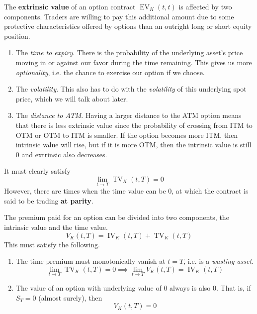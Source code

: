 \documentclass{article}
\DeclareMathOperator{\IV}{IV}
\DeclareMathOperator{\TV}{TV}
\DeclareMathOperator{\EV}{EV}
\begin{document}
    \begin{definition}
      \label{def:extrinsic-value}
      The \textbf{extrinsic value} of an option contract $\EV_K(t, t)$ is affected by two components. Traders are willing to pay this additional amount due to some protective characteristics offered by options than an outright long or short equity position. 
      \begin{enumerate}
        \item The \textit{time to expiry}. There is the probability of the underlying asset's price moving in or against our favor during the time remaining. This gives us more \textit{optionality}, i.e. the chance to exercise our option if we choose. 
        \item The \textit{volatility}. This also has to do with the \textit{volatility} of this underlying spot price, which we will talk about later. 
        \item The \textit{distance to ATM}. Having a larger distance to the ATM option means that there is less extrinsic value since the probability of crossing from ITM to OTM or OTM to ITM is smaller. If the option becomes more ITM, then intrinsic value will rise, but if it is more OTM, then the intrinsic value is still $0$ and extrinsic also decreases.  
      \end{enumerate}
      It must clearly satisfy  
      \begin{equation}
        \lim_{t \rightarrow T} \TV_K (t, T) = 0
      \end{equation}
      However, there are times when the time value can be $0$, at which the contract is said to be trading \textbf{at parity}. 
    \end{definition}

    \begin{theorem}
      \label{thm:components-of-options-premium}
      The premium paid for an option can be divided into two components, the intrinsic value and the time value. 
      \begin{equation}
        V_K(t, T) = \IV_{K} (t, T) + \TV_K (t, T)
      \end{equation}
      This must satisfy the following. 
      \begin{enumerate}
        \item The time premium must monotonically vanish at $t = T$, i.e. is a \textit{wasting asset}. 
          \begin{equation}
            \lim_{t \rightarrow T} \TV_K (t, T) = 0 \implies \lim_{t \rightarrow T} V_K (t, T) = \IV_K (t, T) 
          \end{equation}
        \item The value of an option with underlying value of $0$ always is also $0$. That is, if $S_T = 0$ (almost surely), then 
          \begin{equation}
            V_K (t, T)  = 0
          \end{equation}
      \end{enumerate}
    \end{theorem}
\end{document}
